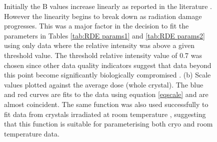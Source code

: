 \begin{figure}
{		Initially the B values increase linearly as reported in the literature \cite{kmetko2006, warkentin2010, leal2012}.
		However the linearity begins to break down as radiation damage progresses.
		This was a major factor in the decision to fit the parameters in Tables \ref{tab:RDE params1} and \ref{tab:RDE params2} using only data where the relative intensity was above a given threshold value.
		The threshold relative intensity value of 0.7 was chosen since other data quality indicators suggest that data beyond this point become significantly biologically compromised \cite{owen2006}.
		(b) Scale values plotted against the average dose (whole crystal).
		The blue and red curves are fits to the data using equation \ref{eqscale} and are almost coincident.
		The same function was also used successfully to fit data from crystals irradiated at room temperature \cite{leal2012}, suggesting that this function is suitable for parameterising both cryo and room temperature data.}
        \label{figlealparam}
\end{figure}

